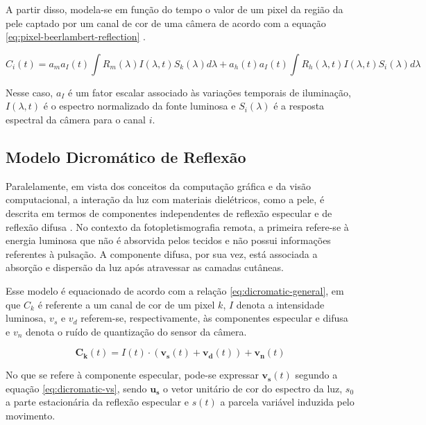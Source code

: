 A partir disso, modela-se em função do tempo o valor de um pixel da região da pele captado por um canal de cor de uma câmera de acordo com a equação \ref{eq:pixel-beerlambert-reflection} \cite{lam2015robust}.

\begin{equation}
    \label{eq:pixel-beerlambert-reflection}
   C_i(t) = a_m a_I(t) \int R_m(\lambda) I(\lambda, t) S_k(\lambda) d\lambda + a_h(t) a_I(t) \int R_h(\lambda, t) I(\lambda, t) S_i(\lambda) d\lambda
\end{equation}

Nesse caso, \(a_I\) é um fator escalar associado às variações temporais de iluminação, \(I(\lambda, t)\) é o espectro normalizado da fonte luminosa e \(S_i(\lambda)\) é a resposta espectral da câmera para o canal \(i\).

\subsection{Modelo Dicromático de Reflexão}

Paralelamente, em vista dos conceitos da computação gráfica e da visão computacional, a interação da luz com materiais dielétricos, como a pele, é descrita em termos de componentes independentes de reflexão especular e de reflexão difusa \cite{klinker1988measurement}. No contexto da fotopletismografia remota, a primeira refere-se à energia luminosa que não é absorvida pelos tecidos e não possui informações referentes à pulsação. A componente difusa, por sua vez, está associada a absorção e dispersão da luz após atravessar as camadas cutâneas. 

Esse modelo é equacionado de acordo com a relação \ref{eq:dicromatic-general}, em que \(C_k\) é referente a um canal de cor de um pixel \(k\), \(I\) denota a intensidade luminosa, \(v_s\) e \(v_d\) referem-se, respectivamente, às componentes especular e difusa e \(v_n\) denota o ruído de quantização do sensor da câmera. 

\begin{equation}
    \label{eq:dicromatic-general}
    \bm{C_k}(t) = I(t) \cdot (\bm{v_s}(t) + \bm{v_d}(t)) + \bm{v_n}(t)
\end{equation}


No que se refere à componente especular, pode-se expressar \(\bm{v_s}(t)\) segundo a equação \ref{eq:dicromatic-vs}, sendo \(\bm{u_s}\) o vetor unitário de cor do espectro da luz, \(s_0\) a parte estacionária da reflexão especular e \(s(t)\) a parcela variável induzida pelo movimento. 

